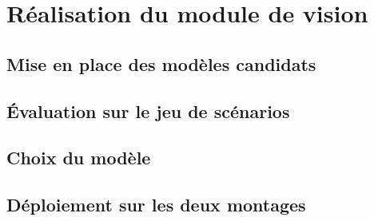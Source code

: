 
\section{Réalisation du module de vision}


\subsection{Mise en place des modèles candidats}

\subsection{Évaluation sur le jeu de scénarios}

\subsection{Choix du modèle}

\subsection{Déploiement sur les deux montages}
